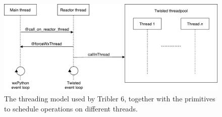 \begin{figure}[h!]
	\centering
	\includegraphics[width=1.0\columnwidth]{images/architecture/threading_model_tribler}
	\caption{The threading model used by Tribler 6, together with the primitives to schedule operations on different threads.}
	\label{fig:old-threading-model}
\end{figure}


